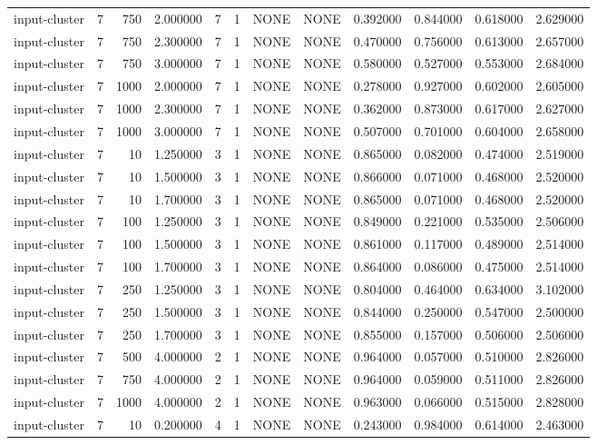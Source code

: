 \begin{tabular}{lrrrllllrrrr}
input-cluster & 7 & 750 & 2.000000 & 7 & 1 & NONE & NONE & 0.392000 & 0.844000 & 0.618000 & 2.629000 \\
input-cluster & 7 & 750 & 2.300000 & 7 & 1 & NONE & NONE & 0.470000 & 0.756000 & 0.613000 & 2.657000 \\
input-cluster & 7 & 750 & 3.000000 & 7 & 1 & NONE & NONE & 0.580000 & 0.527000 & 0.553000 & 2.684000 \\
input-cluster & 7 & 1000 & 2.000000 & 7 & 1 & NONE & NONE & 0.278000 & 0.927000 & 0.602000 & 2.605000 \\
input-cluster & 7 & 1000 & 2.300000 & 7 & 1 & NONE & NONE & 0.362000 & 0.873000 & 0.617000 & 2.627000 \\
input-cluster & 7 & 1000 & 3.000000 & 7 & 1 & NONE & NONE & 0.507000 & 0.701000 & 0.604000 & 2.658000 \\
input-cluster & 7 & 10 & 1.250000 & 3 & 1 & NONE & NONE & 0.865000 & 0.082000 & 0.474000 & 2.519000 \\
input-cluster & 7 & 10 & 1.500000 & 3 & 1 & NONE & NONE & 0.866000 & 0.071000 & 0.468000 & 2.520000 \\
input-cluster & 7 & 10 & 1.700000 & 3 & 1 & NONE & NONE & 0.865000 & 0.071000 & 0.468000 & 2.520000 \\
input-cluster & 7 & 100 & 1.250000 & 3 & 1 & NONE & NONE & 0.849000 & 0.221000 & 0.535000 & 2.506000 \\
input-cluster & 7 & 100 & 1.500000 & 3 & 1 & NONE & NONE & 0.861000 & 0.117000 & 0.489000 & 2.514000 \\
input-cluster & 7 & 100 & 1.700000 & 3 & 1 & NONE & NONE & 0.864000 & 0.086000 & 0.475000 & 2.514000 \\
input-cluster & 7 & 250 & 1.250000 & 3 & 1 & NONE & NONE & 0.804000 & 0.464000 & 0.634000 & 3.102000 \\
input-cluster & 7 & 250 & 1.500000 & 3 & 1 & NONE & NONE & 0.844000 & 0.250000 & 0.547000 & 2.500000 \\
input-cluster & 7 & 250 & 1.700000 & 3 & 1 & NONE & NONE & 0.855000 & 0.157000 & 0.506000 & 2.506000 \\
input-cluster & 7 & 500 & 4.000000 & 2 & 1 & NONE & NONE & 0.964000 & 0.057000 & 0.510000 & 2.826000 \\
input-cluster & 7 & 750 & 4.000000 & 2 & 1 & NONE & NONE & 0.964000 & 0.059000 & 0.511000 & 2.826000 \\
input-cluster & 7 & 1000 & 4.000000 & 2 & 1 & NONE & NONE & 0.963000 & 0.066000 & 0.515000 & 2.828000 \\
input-cluster & 7 & 10 & 0.200000 & 4 & 1 & NONE & NONE & 0.243000 & 0.984000 & 0.614000 & 2.463000 \\

\end{tabular}
